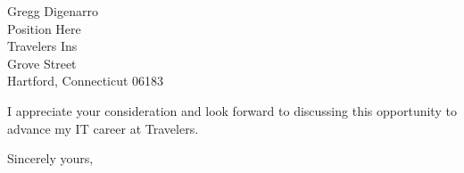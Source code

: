\documentclass{letter} %
\begin{document}
\begin{letter}{Gregg Digenarro \\
Position Here \\
Travelers Ins \\
Grove Street \\
Hartford, Connecticut 06183}

\noindent I appreciate your consideration and look forward to discussing
this opportunity to advance my IT career at Travelers.
 
\closing{Sincerely yours,} 
 

 

\end{letter}
 

\vfill
\end{document}
